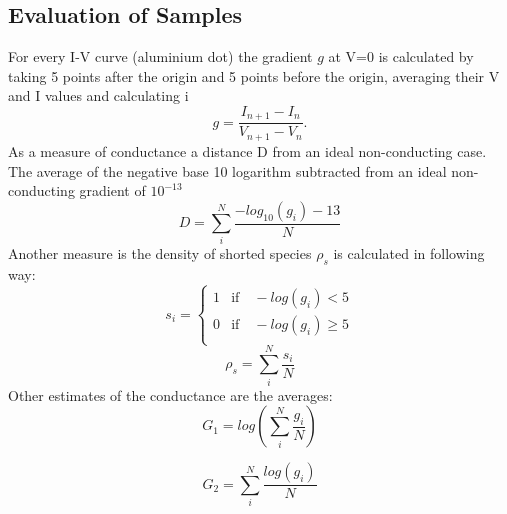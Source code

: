 \documentclass[a4paper]{article}
\begin{document}
\subsection{Evaluation of Samples}
\label{sec:eval}
For every I-V curve (aluminium dot) the gradient $g$ at V=0 is calculated by taking 5 points after the origin and 5 points before the origin, averaging their V and I values and calculating i
\begin{equation}
	g = \frac{I_{n+1} - I_n}{V_{n+1} - V_n}.
\end{equation}
As a measure of conductance a distance D from an ideal non-conducting case. The average of the negative base 10 logarithm subtracted from an ideal non-conducting gradient of $10^{-13}$ 
\begin{equation}
	D = \sum_i^N \frac{ -log_{10}(g_i) - 13}{N}
	\label{eq:D}
\end{equation}
Another measure is the density of shorted species $\rho_{s}$ is calculated in following way:
\begin{equation}
	s_i = \begin{cases}
	1 &\text{if} \quad -log(g_i) < 5 \\
	0 &\text{if} \quad -log(g_i) \geq 5 \\
	\end{cases}
\end{equation}
\begin{equation}
	\rho_s = \sum_i^N \frac{s_i}{N}
	\label{eq:rho}
\end{equation}
Other estimates of the conductance are the averages:
\begin{equation}
	G_1 = log \left( \sum_i^N \frac{g_i}{N} \right)
\end{equation}

\begin{equation}
	G_2 =  \sum_i^N \frac{log(g_i)}{N}
\end{equation}
\end{document}
